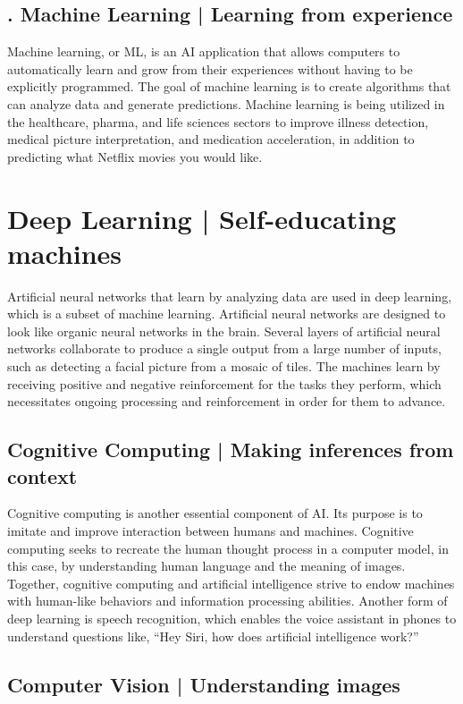 \documentclass[conference]{IEEEtran}
\begin{document}
\subsection{. Machine Learning | Learning from experience}

Machine learning, or ML, is an AI application that allows computers to automatically learn and grow from their experiences without having to be explicitly programmed. The goal of machine learning is to create algorithms that can analyze data and generate predictions. Machine learning is being utilized in the healthcare, pharma, and life sciences sectors to improve illness detection, medical picture interpretation, and medication acceleration, in addition to predicting what Netflix movies you would like.
\section{Deep Learning | Self-educating machines}


Artificial neural networks that learn by analyzing data are used in deep learning, which is a subset of machine learning. Artificial neural networks are designed to look like organic neural networks in the brain. Several layers of artificial neural networks collaborate to produce a single output from a large number of inputs, such as detecting a facial picture from a mosaic of tiles. The machines learn by receiving positive and negative reinforcement for the tasks they perform, which necessitates ongoing processing and reinforcement in order for them to advance.

\subsection{Cognitive Computing | Making inferences from context
}
Cognitive computing is another essential component of AI. Its purpose is to imitate and improve interaction between humans and machines. Cognitive computing seeks to recreate the human thought process in a computer model, in this case, by understanding human language and the meaning of images. Together, cognitive computing and artificial intelligence strive to endow machines with human-like behaviors and information processing abilities. Another form of deep learning is speech recognition, which enables the voice assistant in phones to understand questions like, “Hey Siri, how does artificial intelligence work?”


\subsection{Computer Vision | Understanding images}\label{SCM}
\end{document}
